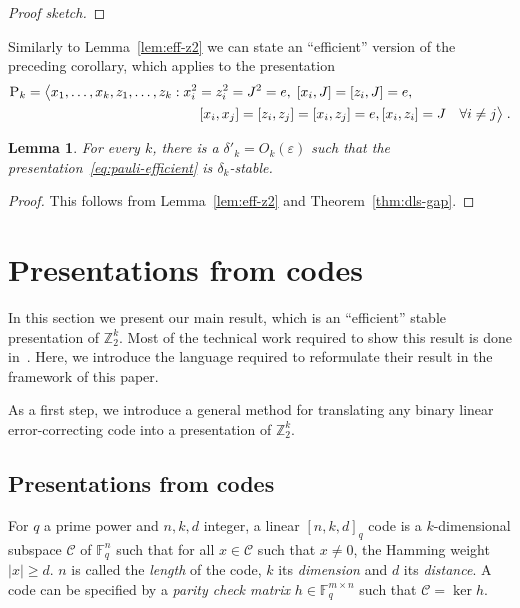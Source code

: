 \documentclass[11pt]{article}
\newtheorem{lemma}[theorem]{Lemma}
\theoremstyle{definition}
\newcommand{\code}{\mathcal{C}}
\newcommand{\F}{\ensuremath{\mathbb{F}}}
\newcommand{\Z}{\ensuremath{\mathbb{Z}}}
\newcommand{\eps}{\varepsilon}
\newcommand{\gamestyle}[1]{\ensuremath{\textsc{#1}}\xspace}
\newcommand{\pauli}{\gamestyle{P}}
\begin{document}
\begin{proof}[Proof sketch]
\end{proof}

Similarly to Lemma~\ref{lem:eff-z2} we can state an ``efficient'' version of the preceding corollary, which applies to the presentation
\begin{align}
 \pauli_k = \big\langle x_1,\ldots,x_k,z_1,\ldots,z_k &: x_i^2=z_i^2=J^2=e,\; [x_i,J]=[z_i,J]=e,\notag\\
&\qquad  [x_i,x_j]=[z_i,z_j]=[x_i,z_j]=e, [x_i,z_i]=J \quad \forall i\neq j \big\rangle\;.\label{eq:pauli-efficient}
\end{align}

\begin{lemma}\label{lem:eff-pauli}
For every $k$, there is a $\delta'_k = O_k(\eps)$ such that the presentation~\eqref{eq:pauli-efficient} is $\delta_k$-stable. 
\end{lemma}

\begin{proof}
This follows from Lemma~\ref{lem:eff-z2} and Theorem~\ref{thm:dls-gap}.
\end{proof}

\section{Presentations from codes}

In this section we present our main result, which is an ``efficient'' stable presentation of $\Z_2^k$. Most of the technical work required to show this result is done in~\cite{ji2020mip}. Here, we introduce the language required to reformulate their result in the framework of this paper. 

As a first step, we introduce a general method for translating any binary linear error-correcting code into a presentation of $\Z_2^k$. 

\subsection{Presentations from codes}
\label{sec:pres-code}

For $q$ a prime power and $n,k,d$ integer, a linear $[n,k,d]_q$ code is a $k$-dimensional subspace $\code$ of $\F_q^n$ such that for all $x\in \code$ such that $x\neq 0$, the Hamming weight $|x|\geq d$. $n$ is called the \emph{length} of the code, $k$ its \emph{dimension} and $d$ its \emph{distance}. A code can be specified by a \emph{parity check matrix} $h\in \F_q^{m\times n}$ such that $\code = \ker h$. 
\end{document}
